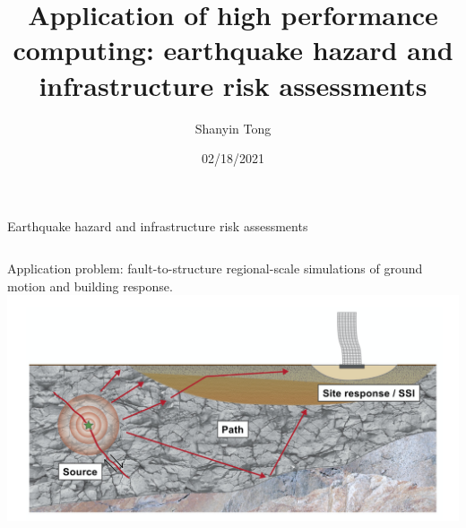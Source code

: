 \documentclass[hangout,aspectratio=1610,10pt]{beamer}
\title[Application of high performance computing: earthquake hazard and infrastructure risk assessments]{Application of high performance computing: earthquake hazard and infrastructure risk assessments 
}
\author{Shanyin Tong}
\institute{Courant Institute of Mathematical Sciences, New York University}
\date{02/18/2021}
\begin{document}
\begin{frame}
  \titlepage
\end{frame}

\begin{frame}{Earthquake hazard and infrastructure risk assessments}
\begin{columns}
\begin{column}{.6\columnwidth}
Application problem: fault-to-structure regional-scale simulations of ground motion and building response.
\includegraphics[width=0.9\linewidth]{plots/fig1}


\end{column}
\end{columns}
\end{frame}
\end{document}
